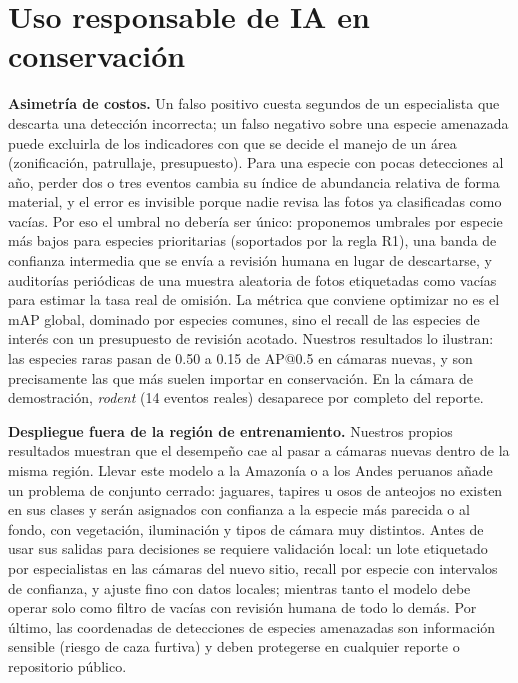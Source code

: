 \documentclass{article}
\begin{document}
\section{Uso responsable de IA en conservación}
\textbf{Asimetría de costos.} Un falso positivo cuesta segundos de un especialista que descarta
una detección incorrecta; un falso negativo sobre una especie amenazada puede excluirla de los
indicadores con que se decide el manejo de un área (zonificación, patrullaje, presupuesto). Para una
especie con pocas detecciones al año, perder dos o tres eventos cambia su índice de abundancia
relativa de forma material, y el error es invisible porque nadie revisa las fotos ya clasificadas
como vacías. Por eso el umbral no debería ser único: proponemos umbrales por especie más bajos para
especies prioritarias (soportados por la regla R1), una banda de confianza intermedia que se envía a
revisión humana en lugar de descartarse, y auditorías periódicas de una muestra aleatoria de fotos
etiquetadas como vacías para estimar la tasa real de omisión. La métrica que conviene optimizar no es
el mAP global, dominado por especies comunes, sino el recall de las especies de interés con un
presupuesto de revisión acotado. Nuestros resultados lo ilustran: las especies raras pasan de 0.50 a
0.15 de AP@0.5 en cámaras nuevas, y son precisamente las que más suelen importar en conservación. En
la cámara de demostración, \emph{rodent} (14 eventos reales) desaparece por completo del reporte.

\textbf{Despliegue fuera de la región de entrenamiento.} Nuestros propios resultados muestran que el
desempeño cae al pasar a cámaras nuevas dentro de la misma región. Llevar este modelo a la Amazonía o
a los Andes peruanos añade un problema de conjunto cerrado: jaguares, tapires u osos de anteojos no
existen en sus clases y serán asignados con confianza a la especie más parecida o al fondo, con
vegetación, iluminación y tipos de cámara muy distintos. Antes de usar sus salidas para decisiones se
requiere validación local: un lote etiquetado por especialistas en las cámaras del nuevo sitio, recall
por especie con intervalos de confianza, y ajuste fino con datos locales; mientras tanto el modelo
debe operar solo como filtro de vacías con revisión humana de todo lo demás. Por último, las
coordenadas de detecciones de especies amenazadas son información sensible (riesgo de caza furtiva) y
deben protegerse en cualquier reporte o repositorio público.

\end{document}
